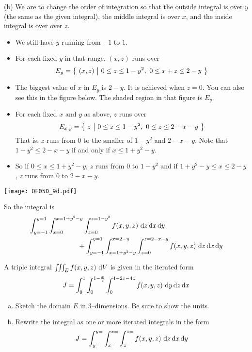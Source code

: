 \begin{solution}
(b) We are to change the order of integration so that the outside 
integral is over $y$ (the same as the given integral),
the middle integral is over $x$, and the inside integral is over
over $z$. 
\begin{itemize}
\item
We still have $y$ running from $-1$ to $1$.
\item
For each fixed $y$ in that range, $(x,z)$ runs over
\begin{equation*}
E_y=\Set{(x,z)}{0\le z\le 1-y^2,\ 0\le x+z\le 2-y}
\end{equation*}
\item 
The biggest value of $x$ in $E_y$ is $2-y$. It is achieved
when $z=0$. You can also see this in the figure below.
The shaded region in that figure is $E_y$.
\item
For each fixed $x$ and $y$ as above,  $z$ runs over
\begin{equation*}
E_{x,y} = \big\{ \ z\ \big|\ 0\le z\le 1-y^2,\ 0\le z\le 2-x-y\ \big\}
\end{equation*}
That is, $z$ runs from $0$ to the smaller of
$1-y^2$ and $2-x-y$. Note that $1-y^2\le 2-x-y$
if and only if $x\le 1+y^2-y$.
\item
So if $0\le x\le 1+y^2-y$, $z$ runs from $0$ to $1-y^2$
and if $1+y^2-y\le x\le 2-y$, $z$ runs from $0$ to $2-x-y$.
\end{itemize}

\begin{center}
     \texttt{[image: OE05D\_9d.pdf]}
\end{center}

So the integral is
\begin{align*}
&\int_{y=-1}^{y=1} \int_{x=0}^{x=1+y^2-y} \int_{z=0}^{z=1-y^2} f(x,y,z)
                                    \ \mathrm{d}z\,\mathrm{d}x\,\mathrm{d}y \\
&\hskip1in
+\int_{y=-1}^{y=1} \int_{x=1+y^2-y}^{x=2-y} \int_{z=0}^{z=2-x-y} f(x,y,z)
                                    \ \mathrm{d}z\,\mathrm{d}x\,\mathrm{d}y
\end{align*}
\end{solution}


\begin{question}[M200 2006D] %
A triple integral $\tripInt_E f(x,y,z)\ \dee{V}$ is given in the 
iterated form
\begin{equation*}
J = \int_0^1 \int_0^{1-\frac{x}{2}} \int_0^{4-2x-4z} f(x,y,z)
                                    \ \dee{y}\,\dee{z}\,\dee{x}
\end{equation*}
\begin{enumerate}[(a)]
\item
Sketch the domain $E$ in 3--dimensions. Be sure to show the units.
\item
Rewrite the integral as one or more iterated integrals in the form
\begin{equation*}
J = \int_{y=}^{y=} \int_{x=}^{x=} \int_{z=}^{z=} f(x,y,z)
                                    \ \dee{z}\,\dee{x}\,\dee{y}
\end{equation*}
\end{enumerate}
\end{question}

